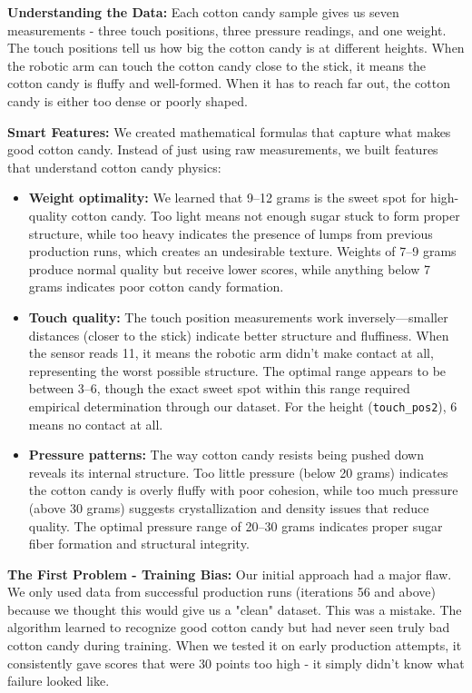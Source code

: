 \textbf{Understanding the Data:} Each cotton candy sample gives us seven measurements - three touch positions, three pressure readings, and one weight. The touch positions tell us how big the cotton candy is at different heights. When the robotic arm can touch the cotton candy close to the stick, it means the cotton candy is fluffy and well-formed. When it has to reach far out, the cotton candy is either too dense or poorly shaped.

\textbf{Smart Features:} We created mathematical formulas that capture what makes good cotton candy. Instead of just using raw measurements, we built features that understand cotton candy physics:
\begin{itemize}
    \item \textbf{Weight optimality:} We learned that 9--12 grams is the sweet spot for high-quality cotton candy. Too light means not enough sugar stuck to form proper structure, while too heavy indicates the presence of lumps from previous production runs, which creates an undesirable texture. Weights of 7--9 grams produce normal quality but receive lower scores, while anything below 7 grams indicates poor cotton candy formation.
    \item \textbf{Touch quality:} The touch position measurements work inversely---smaller distances (closer to the stick) indicate better structure and fluffiness. When the sensor reads 11, it means the robotic arm didn't make contact at all, representing the worst possible structure. The optimal range appears to be between 3--6, though the exact sweet spot within this range required empirical determination through our dataset. For the height (\texttt{touch\_pos2}), 6 means no contact at all.
    \item \textbf{Pressure patterns:} The way cotton candy resists being pushed down reveals its internal structure. Too little pressure (below 20 grams) indicates the cotton candy is overly fluffy with poor cohesion, while too much pressure (above 30 grams) suggests crystallization and density issues that reduce quality. The optimal pressure range of 20--30 grams indicates proper sugar fiber formation and structural integrity.
\end{itemize}

\textbf{The First Problem - Training Bias:} Our initial approach had a major flaw. We only used data from successful production runs (iterations 56 and above) because we thought this would give us a "clean" dataset. This was a mistake. The algorithm learned to recognize good cotton candy but had never seen truly bad cotton candy during training. When we tested it on early production attempts, it consistently gave scores that were 30 points too high - it simply didn't know what failure looked like.

